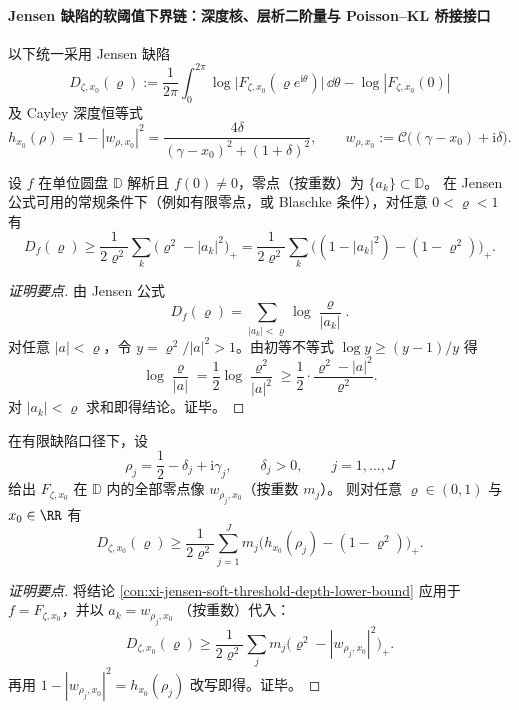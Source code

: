 \paragraph{Jensen 缺陷的软阈值下界链：深度核、层析二阶量与 Poisson--KL 桥接接口}
以下统一采用 Jensen 缺陷
\[
D_{\zeta,x_0}(\varrho)
:=\frac1{2\pi}\int_0^{2\pi}\log\bigl|F_{\zeta,x_0}(\varrho e^{\mathrm{i}\theta})\bigr|\,\dd\theta-\log|F_{\zeta,x_0}(0)|
\]
及 Cayley 深度恒等式
\[
h_{x_0}(\rho)=1-|w_{\rho,x_0}|^2
=\frac{4\delta}{(\gamma-x_0)^2+(1+\delta)^2},
\qquad
w_{\rho,x_0}:=\mathcal C\!\bigl((\gamma-x_0)+\mathrm{i}\delta\bigr).
\]

\begin{conclusion}\label{con:xi-jensen-soft-threshold-depth-lower-bound}
设 \(f\) 在单位圆盘 \(\mathbb D\) 解析且 \(f(0)\neq 0\)，零点（按重数）为 \(\{a_k\}\subset\mathbb D\)。
在 Jensen 公式可用的常规条件下（例如有限零点，或 Blaschke 条件），对任意 \(0<\varrho<1\) 有
\[
D_f(\varrho)
\ge
\frac1{2\varrho^2}\sum_k\bigl(\varrho^2-|a_k|^2\bigr)_+
=
\frac1{2\varrho^2}\sum_k\bigl((1-|a_k|^2)-(1-\varrho^2)\bigr)_+.
\]
\end{conclusion}
\begin{proof}[证明要点]
由 Jensen 公式
\[
D_f(\varrho)=\sum_{|a_k|<\varrho}\log\frac{\varrho}{|a_k|}.
\]
对任意 \(|a|<\varrho\)，令 \(y=\varrho^2/|a|^2>1\)。由初等不等式
\(
\log y\ge (y-1)/y
\)
得
\[
\log\frac{\varrho}{|a|}
=\frac12\log\frac{\varrho^2}{|a|^2}
\ge
\frac12\cdot\frac{\varrho^2-|a|^2}{\varrho^2}.
\]
对 \(|a_k|<\varrho\) 求和即得结论。证毕。
\end{proof}

\begin{conclusion}\label{con:xi-jensen-soft-threshold-defect-kernel-explicit-sum}
在有限缺陷口径下，设
\[
\rho_j=\frac12-\delta_j+\mathrm{i}\gamma_j,\qquad
\delta_j>0,\qquad
j=1,\dots,J
\]
给出 \(F_{\zeta,x_0}\) 在 \(\mathbb D\) 内的全部零点像 \(w_{\rho_j,x_0}\)（按重数 \(m_j\)）。
则对任意 \(\varrho\in(0,1)\) 与 \(x_0\in\RR\) 有
\[
D_{\zeta,x_0}(\varrho)
\ge
\frac1{2\varrho^2}\sum_{j=1}^J
m_j\bigl(h_{x_0}(\rho_j)-(1-\varrho^2)\bigr)_+.
\]
\end{conclusion}
\begin{proof}[证明要点]
将结论 \ref{con:xi-jensen-soft-threshold-depth-lower-bound} 应用于 \(f=F_{\zeta,x_0}\)，并以
\(
a_k=w_{\rho_j,x_0}
\)
（按重数）代入：
\[
D_{\zeta,x_0}(\varrho)\ge
\frac1{2\varrho^2}\sum_j m_j\bigl(\varrho^2-|w_{\rho_j,x_0}|^2\bigr)_+.
\]
再用
\(
1-|w_{\rho_j,x_0}|^2=h_{x_0}(\rho_j)
\)
改写即得。证毕。
\end{proof}

